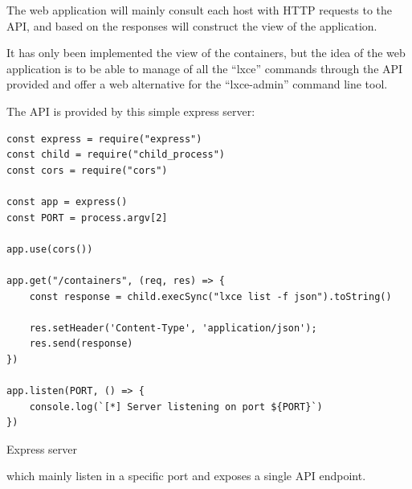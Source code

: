 The web application will mainly consult each host with HTTP requests to the API, and based on the responses will construct the view of the application. 

It has only been implemented the view of the containers, but the idea of the web application is to be able to manage of all the ``lxce'' commands through the API provided and offer a web alternative for the ``lxce-admin'' command line tool.

\newpage
The API is provided by this simple express server:
\begin{listing}[H]
\begin{verbatim}
const express = require("express")
const child = require("child_process")
const cors = require("cors")

const app = express()
const PORT = process.argv[2]

app.use(cors())

app.get("/containers", (req, res) => {
    const response = child.execSync("lxce list -f json").toString()

    res.setHeader('Content-Type', 'application/json');
    res.send(response)
})

app.listen(PORT, () => {
    console.log(`[*] Server listening on port ${PORT}`)
})
\end{verbatim}
\caption{Express server}
\label{listings: lxce alias}
\end{listing}

which mainly listen in a specific port and exposes a single API endpoint.

